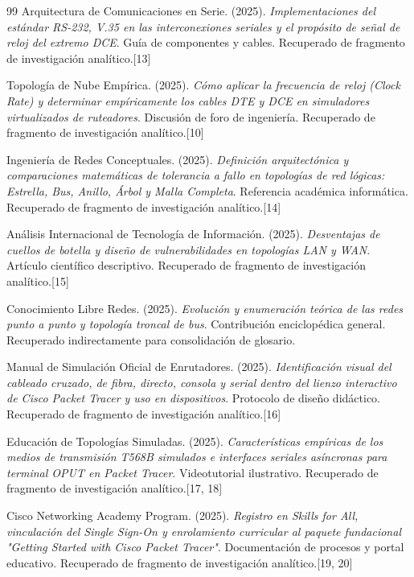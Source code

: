 \documentclass[a4paper,12pt]{article}
\begin{document}
\begin{thebibliography}{99}
Arquitectura de Comunicaciones en Serie. (2025). \textit{Implementaciones del estándar RS-232, V.35 en las interconexiones seriales y el propósito de señal de reloj del extremo DCE}. Guía de componentes y cables. Recuperado de fragmento de investigación analítico.[13]

Topología de Nube Empírica. (2025). \textit{Cómo aplicar la frecuencia de reloj (Clock Rate) y determinar empíricamente los cables DTE y DCE en simuladores virtualizados de ruteadores}. Discusión de foro de ingeniería. Recuperado de fragmento de investigación analítico.[10]

Ingeniería de Redes Conceptuales. (2025). \textit{Definición arquitectónica y comparaciones matemáticas de tolerancia a fallo en topologías de red lógicas: Estrella, Bus, Anillo, Árbol y Malla Completa}. Referencia académica informática. Recuperado de fragmento de investigación analítico.[14]

Análisis Internacional de Tecnología de Información. (2025). \textit{Desventajas de cuellos de botella y diseño de vulnerabilidades en topologías LAN y WAN}. Artículo científico descriptivo. Recuperado de fragmento de investigación analítico.[15]

Conocimiento Libre Redes. (2025). \textit{Evolución y enumeración teórica de las redes punto a punto y topología troncal de bus}. Contribución enciclopédica general. Recuperado indirectamente para consolidación de glosario.

Manual de Simulación Oficial de Enrutadores. (2025). \textit{Identificación visual del cableado cruzado, de fibra, directo, consola y serial dentro del lienzo interactivo de Cisco Packet Tracer y uso en dispositivos}. Protocolo de diseño didáctico. Recuperado de fragmento de investigación analítico.[16]

Educación de Topologías Simuladas. (2025). \textit{Características empíricas de los medios de transmisión T568B simulados e interfaces seriales asíncronas para terminal OPUT en Packet Tracer}. Videotutorial ilustrativo. Recuperado de fragmento de investigación analítico.[17, 18]

Cisco Networking Academy Program. (2025). \textit{Registro en Skills for All, vinculación del Single Sign-On y enrolamiento curricular al paquete fundacional "Getting Started with Cisco Packet Tracer"}. Documentación de procesos y portal educativo. Recuperado de fragmento de investigación analítico.[19, 20]


\end{thebibliography}
\end{document}
